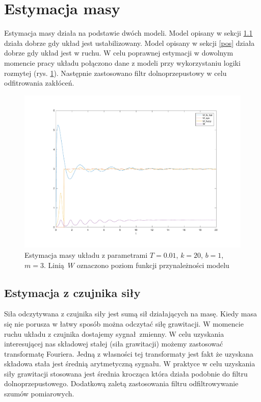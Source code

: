 \documentclass[a4paper]{article}
\begin{document}
\section{Estymacja masy}
Estymacja masy działa na podstawie dwóch modeli. Model opisany w sekcji \ref{fs} działa dobrze gdy układ jest ustabilizowany. Model opisany w sekcji \ref{pos} działa dobrze gdy układ jest w ruchu. W celu poprawnej estymacji w dowolnym momencie pracy układu połączono dane z modeli przy wykorzystaniu logiki rozmytej (rys. \ref{fig:system_mass}). Następnie zastosowano filtr dolnoprzepustowy w celu odfitrowania zakłóceń.
  
\begin{figure}[H]
	\includegraphics[width=0.99\linewidth]{system_mass}
	\centering
	\caption{Estymacja masy układu z parametrami $T=0.01$, $k = 20$, $b = 1$, $m = 3$. Linią $W$ oznaczono poziom funkcji przynależności modelu }
	\label{fig:system_mass}
\end{figure}

\subsection{Estymacja z czujnika siły}
\label{fs}
Siła odczytywana z czujnika siły jest sumą sił działających na masę. Kiedy masa się nie porusza w łatwy sposób można odczytać siłę grawitacji. W momencie ruchu układu z czujnika dostajemy sygnał zmienny. W celu uzyskania interesującej nas składowej stałej (siła grawitacji) możemy zastosować transformatę Fouriera. Jedną z własności tej transformaty jest fakt że uzyskana składowa stała jest średnią arytmetyczną sygnału. W praktyce w celu uzyskania siły grawitacji stosowana jest średnia krocząca która działa podobnie do filtru dolnoprzepustowego. Dodatkową zaletą zastosowania filtru odfiltrowywanie szumów pomiarowych.
\end{document}
